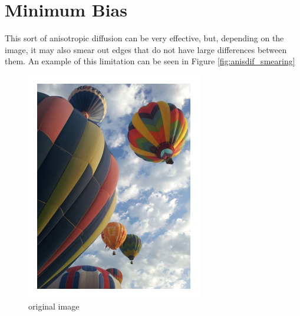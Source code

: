 \section*{Minimum Bias}

This sort of anisotropic diffusion can be very effective, but, depending on the image, it may also smear out edges that do not have large differences between them.
An example of this limitation can be seen in Figure \ref{fig:anisdif_smearing}

\begin{figure}
\begin{minipage}[b]{.45\linewidth}
\centering
\includegraphics[width=\textwidth]{figures/balloons_colors.pdf}
\caption*{original image}
\end{minipage}
\hspace{0.5cm}
\begin{minipage}[b]{0.45\linewidth}
\centering

\end{minipage}
\end{figure}
